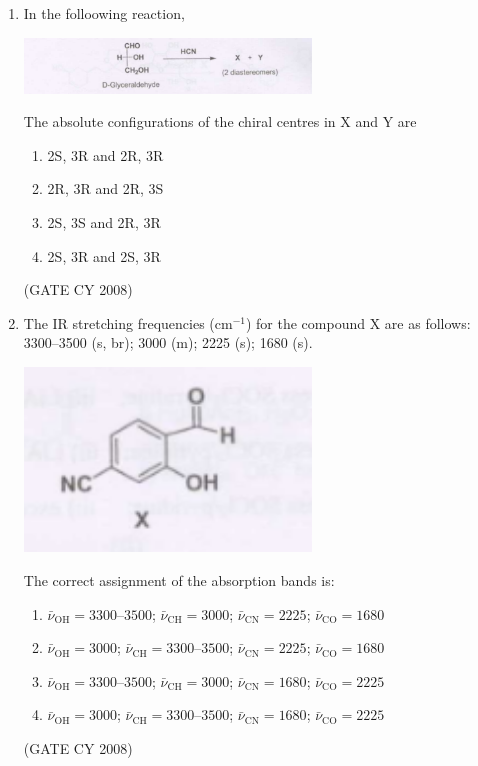 \documentclass[12pt]{article}
\begin{document}
\begin{enumerate}
\item In the folloowing reaction,

\begin{center}
\includegraphics[width=0.6\textwidth]{figs/q52.png}
\end{center}

 The absolute configurations of the chiral centres in X and Y are

\begin{enumerate}
\item \quad 2S, 3R \quad and \quad 2R, 3R 
\item \quad 2R, 3R \quad and \quad 2R, 3S 
\item \quad 2S, 3S \quad and \quad 2R, 3R 
\item \quad 2S, 3R \quad and \quad 2S, 3R
\end{enumerate}    \hfill{(GATE CY 2008)}


\item The IR stretching frequencies (cm$^{-1}$) for the compound X are as follows: 3300--3500 (s, br); 3000 (m); 2225 (s); 1680 (s). 

\begin{center}
\includegraphics[width=0.6\textwidth]{figs/q53.png}
\end{center}

The correct assignment of the absorption bands is:

\begin{enumerate}
\item \quad $\bar{\nu}_{\text{OH}} = 3300$--$3500$; $\bar{\nu}_{\text{CH}} = 3000$; $\bar{\nu}_{\text{CN}} = 2225$; $\bar{\nu}_{\text{CO}} = 1680$ 
\item \quad $\bar{\nu}_{\text{OH}} = 3000$; $\bar{\nu}_{\text{CH}} = 3300$--$3500$; $\bar{\nu}_{\text{CN}} = 2225$; $\bar{\nu}_{\text{CO}} = 1680$ 
\item \quad $\bar{\nu}_{\text{OH}} = 3300$--$3500$; $\bar{\nu}_{\text{CH}} = 3000$; $\bar{\nu}_{\text{CN}} = 1680$; $\bar{\nu}_{\text{CO}} = 2225$ 
\item \quad $\bar{\nu}_{\text{OH}} = 3000$; $\bar{\nu}_{\text{CH}} = 3300$--$3500$; $\bar{\nu}_{\text{CN}} = 1680$; $\bar{\nu}_{\text{CO}} = 2225$
\end{enumerate}    \hfill{(GATE CY 2008)}



\end{enumerate}
\end{document}
